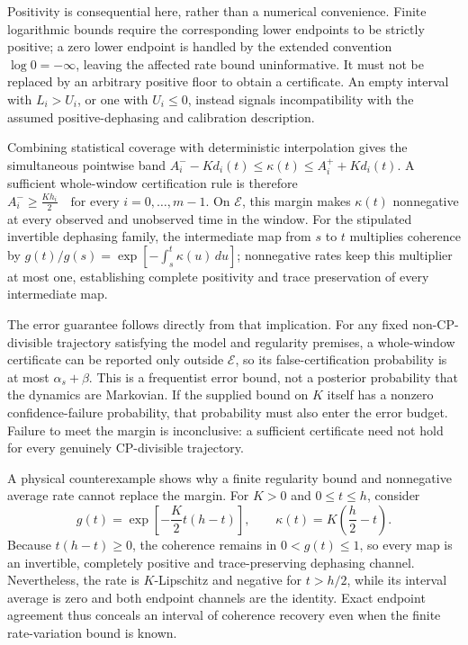 \documentclass[11pt]{article}
\begin{document}
Positivity is consequential here, rather than a numerical convenience. Finite logarithmic bounds require the corresponding lower endpoints to be strictly positive; a zero lower endpoint is handled by the extended convention $\log0=-\infty$, leaving the affected rate bound uninformative. It must not be replaced by an arbitrary positive floor to obtain a certificate. An empty interval with $L_i>U_i$, or one with $U_i\leq0$, instead signals incompatibility with the assumed positive-dephasing and calibration description.

Combining statistical coverage with deterministic interpolation gives the simultaneous pointwise band
$A_i^- - Kd_i(t)\leq\kappa(t)\leq A_i^+ + Kd_i(t).$
A sufficient whole-window certification rule is therefore
$A_i^-\geq\frac{Kh_i}{2}\quad\text{for every }i=0,\ldots,m-1.$
On $\mathcal E$, this margin makes $\kappa(t)$ nonnegative at every observed and unobserved time in the window. For the stipulated invertible dephasing family, the intermediate map from $s$ to $t$ multiplies coherence by $g(t)/g(s)=\exp[-\int_s^t\kappa(u)\,du]$; nonnegative rates keep this multiplier at most one, establishing complete positivity and trace preservation of every intermediate map.

The error guarantee follows directly from that implication. For any fixed non-CP-divisible trajectory satisfying the model and regularity premises, a whole-window certificate can be reported only outside $\mathcal E$, so its false-certification probability is at most $\alpha_s+\beta$. This is a frequentist error bound, not a posterior probability that the dynamics are Markovian. If the supplied bound on $K$ itself has a nonzero confidence-failure probability, that probability must also enter the error budget. Failure to meet the margin is inconclusive: a sufficient certificate need not hold for every genuinely CP-divisible trajectory.

A physical counterexample shows why a finite regularity bound and nonnegative average rate cannot replace the margin. For $K>0$ and $0\leq t\leq h$, consider
\[g(t)=\exp\!\left[-\frac{K}{2}t(h-t)\right],\qquad\kappa(t)=K\left(\frac h2-t\right).\]
Because $t(h-t)\geq0$, the coherence remains in $0<g(t)\leq1$, so every map is an invertible, completely positive and trace-preserving dephasing channel. Nevertheless, the rate is $K$-Lipschitz and negative for $t>h/2$, while its interval average is zero and both endpoint channels are the identity. Exact endpoint agreement thus conceals an interval of coherence recovery even when the finite rate-variation bound is known.
\end{document}
